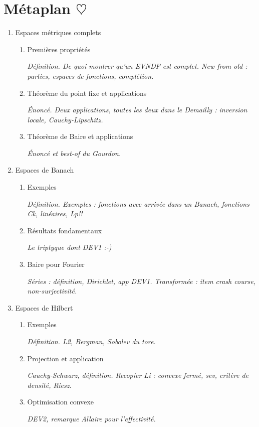 \documentclass[twocolumn, landscape]{article}
\begin{document}
\newpage

\section*{Métaplan $\heartsuit$}

\begin{enumerate}
    \item Espaces métriques complets
    \begin{enumerate}
        \item Premières propriétés
        
        \emph{Définition. De quoi montrer qu'un EVNDF est complet. New from old : parties, espaces de fonctions, complétion.}
        \item Théorème du point fixe et applications
        
        \emph{Énoncé. Deux applications, toutes les deux dans le Demailly : inversion locale, Cauchy-Lipschitz.}
        \item Théorème de Baire et applications
    
        \emph{Énoncé et best-of du Gourdon.}
    \end{enumerate}
    \item Espaces de Banach
    \begin{enumerate}
        \item Exemples

        \emph{Définition. Exemples : fonctions avec arrivée dans un Banach, fonctions Ck, linéaires, Lp!!}
        \item Résultats fondamentaux

        \emph{Le triptyque dont DEV1 :-)}
        \item Baire pour Fourier
        
        \emph{Séries : définition, Dirichlet, app DEV1. Transformée : item crash course, non-surjectivité.}
    \end{enumerate}
    \item Espaces de Hilbert 
    \begin{enumerate}
        \item Exemples

        \emph{Définition. L2, Bergman, Sobolev du tore.}
        \item Projection et application
        
        \emph{Cauchy-Schwarz, définition. Recopier Li : convexe fermé, sev, critère de densité, Riesz.}
        \item Optimisation convexe
        
        \emph{DEV2, remarque Allaire pour l'effectivité.}
    \end{enumerate}
\end{enumerate}
\end{document}
